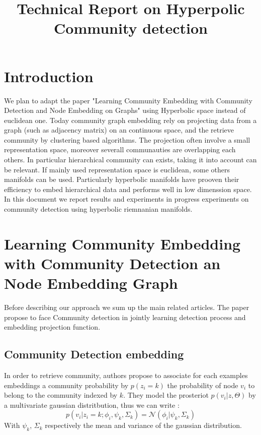 \documentclass{article}
\title{Technical Report on Hyperpolic Community detection}
\author{}
\begin{document}
    \maketitle
    \section{Introduction}

        We plan to adapt the paper "Learning Community Embedding with Community Detection and Node Embedding on Graphs"
        using Hyperbolic space instead of euclidean one.
        Today community graph embedding rely on projecting data from a graph (such as adjacency matrix) on an continuous 
        space, and the retrieve community by clustering based algorithms.
        The  projection often involve a small representation space, moreover severall communauties are overlapping each others.
        In particular hierarchical community can exists, taking it into account can be relevant.
        If mainly used representation space is euclidean, some others manifolds can be used.
        Particularly hyperbolic manifolds have prooven their efficiency to embed hierarchical data and performs well in low dimenssion space.
        In this document we report results and experiments in progress experiments on community detection using hyperbolic riemnanian manifolds.

    \section{Learning Community Embedding with Community Detection an Node Embedding Graph}
    Before describing our approach we sum up the main related articles.  The paper propose to face Community detection in jointly learning detection process and embedding projection function.

    \subsection{Community Detection embedding}
        In order to retrieve community, authors propose to associate for each examples embeddings a community probability by $p(z_i=k)$ the probability of node $v_i$ to belong to the community indexed by $k$. They model the prosteriot $p(v_i|z, \Theta)$ by a multivariate gaussian distritbution, thus we can write :
        $$
            p(v_i |z_i = k; \phi_i, \psi_k, \Sigma_k) = \mathcal{N}(\phi_i| \psi_k, \Sigma_k)
        $$
        With $\psi_k$, $\Sigma_k$ respectively the mean and variance of the gaussian distribution.
\end{document}
